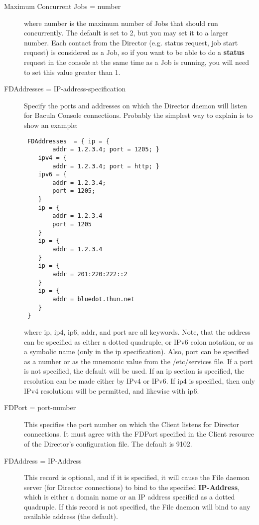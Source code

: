\begin{description}
\item [Maximum Concurrent Jobs = \lt{}number\gt{}]
   where \lt{}number\gt{} is the maximum number of Jobs that should run
   concurrently.  The default is set to 2, but you may set it to a larger
   number.  Each contact from the Director (e.g.  status request, job start
   request) is considered as a Job, so if you want to be able to do a {\bf
   status} request in the console at the same time as a Job is running, you
   will need to set this value greater than 1.

\item [FDAddresses = \lt{}IP-address-specification\gt{}]
   Specify the ports and addresses on which the Director daemon will listen
   for Bacula Console connections.  Probably the simplest way to explain is
   to show an example:

\footnotesize
\begin{verbatim}
 FDAddresses  = { ip = {
        addr = 1.2.3.4; port = 1205; }
    ipv4 = {
        addr = 1.2.3.4; port = http; }
    ipv6 = {
        addr = 1.2.3.4;
        port = 1205;
    }
    ip = {
        addr = 1.2.3.4
        port = 1205
    }
    ip = {
        addr = 1.2.3.4
    }
    ip = {
        addr = 201:220:222::2
    }
    ip = {
        addr = bluedot.thun.net
    }
 }
\end{verbatim}
\normalsize

where ip, ip4, ip6, addr, and port are all keywords. Note, that  the address
can be specified as either a dotted quadruple, or  IPv6 colon notation, or as
a symbolic name (only in the ip specification).  Also, port can be specified
as a number or as the mnemonic value from  the /etc/services file.  If a port
is not specified, the default will be used. If an ip  section is specified,
the resolution can be made either by IPv4 or  IPv6. If ip4 is specified, then
only IPv4 resolutions will be permitted,  and likewise with ip6.  

\item [FDPort = \lt{}port-number\gt{}]
   This specifies the port number  on which the Client listens for Director
connections. It must agree  with the FDPort specified in the Client resource
of the Director's  configuration file. The default is 9102. 

\item [FDAddress = \lt{}IP-Address\gt{}]
   This record is optional,  and if it is specified, it will cause the File
daemon server (for  Director connections) to bind to the specified {\bf
IP-Address},  which is either a domain name or an IP address specified as a 
dotted quadruple. If this record is not specified, the File daemon  will bind
to any available address (the default). 


\end{description}
